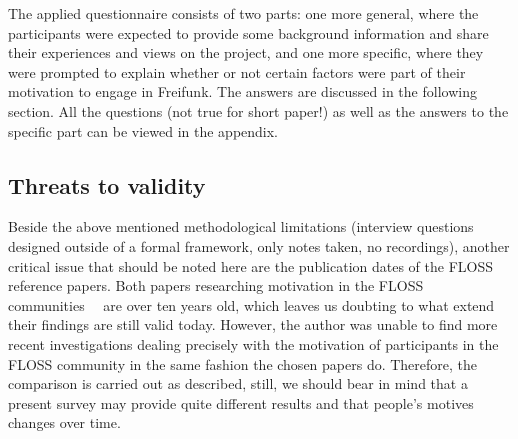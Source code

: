 The applied questionnaire consists of two parts: one more general, where the participants were expected to provide some background information and share their experiences and views on the project, and one more specific, where they were prompted to explain whether or not certain factors were part of their motivation to engage in Freifunk.
The answers are discussed in the following section.
All the questions (not true for short paper!) as well as the answers to the specific part can be viewed in the appendix.

\subsection{Threats to validity}
Beside the above mentioned methodological limitations (interview questions designed outside of a formal framework, only notes taken, no recordings),
another critical issue that should be noted here are the publication dates of the FLOSS reference papers.
Both papers researching motivation in the FLOSS communities~\cite{HarOu2002}~\cite{LakWo2005} are over ten years old, which leaves us doubting to what extend their findings are still valid today.
However, the author was unable to find more recent investigations dealing precisely with the motivation of participants in the FLOSS community in the same fashion the chosen papers do.
Therefore, the comparison is carried out as described, still, we should bear in mind that a present survey may provide quite different results and that people's motives changes over time.

\begin{comment}
\begin{itemize}
  \item literature review for FLOSS <-- only as comparison
  \item semi-structured interviews for Freifunk <-- focus
    \begin{itemize}
      \item limitations of the methodology
    \end{itemize}
\end{itemize}
\end{comment}
